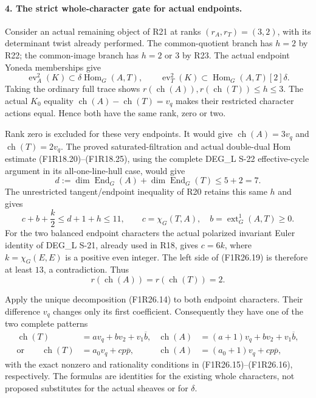 \paragraph{4. The strict whole-character gate for actual endpoints.}
Consider an actual remaining object of R21
at ranks $(r_A,r_T)=(3,2)$, with its determinant
twist already performed. The common-quotient
branch has $h=2$ by R22; the common-image
branch has $h=2$ or $3$ by R23. The actual
endpoint Yoneda memberships give
\[
 \operatorname{ev}_A^2(K)\subset
                   \delta\operatorname{Hom}_G(A,T),
       \qquad
 \operatorname{ev}_T^2(K)\subset
                   \operatorname{Hom}_G(A,T)[2]\delta.
 \tag{F1R26.17}
\]
Taking the ordinary full trace shows
$r(\operatorname{ch}(A)),r(\operatorname{ch}(T))\le h\le3$.
The actual $K_0$ equality
$\operatorname{ch}(A)-\operatorname{ch}(T)=v_q$
makes their restricted character actions equal.
Hence both have the same rank, zero or two.

Rank zero is excluded for these very endpoints.
It would give
$\operatorname{ch}(A)=3v_q$ and
$\operatorname{ch}(T)=2v_q$.
The proved saturated-filtration and actual
double-dual Hom estimate (F1R18.20)--(F1R18.25),
using the complete DEG\_L S-22 effective-cycle
argument in its all-one-line-hull case, would give
\[
 d:=\dim\operatorname{End}_G(A)+\dim\operatorname{End}_G(T)
                         \le5+2=7.
 \tag{F1R26.18}
\]
The unrestricted tangent/endpoint inequality of
R20 retains this same $h$ and gives
\[
 c+b+\frac{k}{2}\le d+1+h\le11,\qquad
 c=\chi_G(T,A),\quad b=\operatorname{ext}^1_G(A,T)\ge0.
 \tag{F1R26.19}
\]
For the two balanced endpoint characters the
actual polarized invariant Euler identity of
DEG\_L S-21, already used in R18, gives
$c=6k$, where $k=\chi_G(E,E)$ is a positive
even integer. The left side of (F1R26.19) is
therefore at least $13$, a contradiction.
Thus
\[
           r(\operatorname{ch}(A))
             =r(\operatorname{ch}(T))=2.
 \tag{F1R26.20}
\]

Apply the unique decomposition (F1R26.14) to
both endpoint characters. Their difference
$v_q$ changes only its first coefficient.
Consequently they have one of the two
complete patterns
\[
 \begin{aligned}
 \operatorname{ch}(T)&=a v_q+bv_2+v_1\overline b,&
 \operatorname{ch}(A)&=(a+1)v_q+bv_2+v_1\overline b,\\
 \text{or}\qquad
 \operatorname{ch}(T)&=a_0v_q+c p\overline p,&
 \operatorname{ch}(A)&=(a_0+1)v_q+c p\overline p,
 \end{aligned}
 \tag{F1R26.21}
\]
with the exact nonzero and rationality conditions
in (F1R26.15)--(F1R26.16), respectively.
The formulas are identities for the existing
whole characters, not proposed substitutes for
the actual sheaves or for $\delta$.


